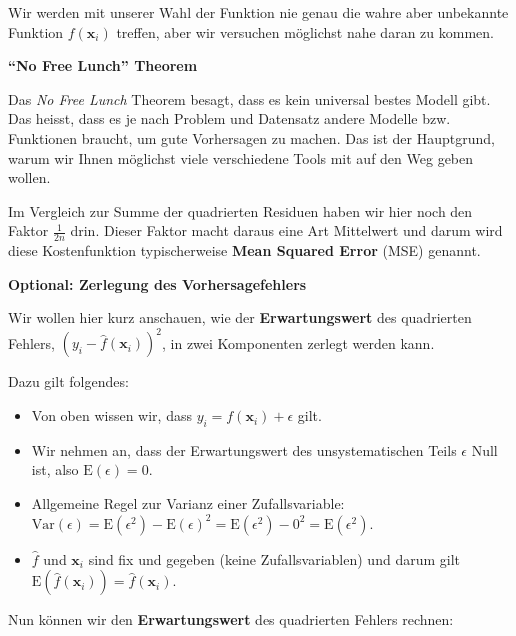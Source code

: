 \documentclass[
]{book}
\providecommand{\tightlist}{%
  \setlength{\itemsep}{0pt}\setlength{\parskip}{0pt}}
\begin{document}
Wir werden mit unserer Wahl der Funktion nie genau die wahre aber unbekannte Funktion \(f(\mathbf{x}_i)\) treffen, aber wir versuchen möglichst nahe daran zu kommen.

\textbf{``No Free Lunch'' Theorem}

Das \emph{No Free Lunch} Theorem besagt, dass es kein universal bestes Modell gibt. Das heisst, dass es je nach Problem und Datensatz andere Modelle bzw. Funktionen braucht, um gute Vorhersagen zu machen. Das ist der Hauptgrund, warum wir Ihnen möglichst viele verschiedene Tools mit auf den Weg geben wollen.

Im Vergleich zur Summe der quadrierten Residuen haben wir hier noch den Faktor \(\frac{1}{2n}\) drin. Dieser Faktor macht daraus eine Art Mittelwert und darum wird diese Kostenfunktion typischerweise \textbf{Mean Squared Error} (MSE) genannt.

\textbf{Optional: Zerlegung des Vorhersagefehlers}

Wir wollen hier kurz anschauen, wie der \textbf{Erwartungswert} des quadrierten Fehlers, \(\left(y_i - \hat{f}(\mathbf{x}_i)\right)^2\), in zwei Komponenten zerlegt werden kann.

Dazu gilt folgendes:

\begin{itemize}
\tightlist
\item
  Von oben wissen wir, dass \(y_i = f(\mathbf{x}_i) + \epsilon\) gilt.
\item
  Wir nehmen an, dass der Erwartungswert des unsystematischen Teils \(\epsilon\) Null ist, also \(\text{E}(\epsilon)=0\).
\item
  Allgemeine Regel zur Varianz einer Zufallsvariable: \(\text{Var}(\epsilon) = \text{E}(\epsilon^2) - \text{E}(\epsilon)^2 = \text{E}(\epsilon^2) - 0^2 = \text{E}(\epsilon^2)\).
\item
  \(\hat{f}\) und \(\mathbf{x}_i\) sind fix und gegeben (keine Zufallsvariablen) und darum gilt \(\text{E}\left(\hat{f}(\mathbf{x}_i)\right)=\hat{f}(\mathbf{x}_i)\).
\end{itemize}

Nun können wir den \textbf{Erwartungswert} des quadrierten Fehlers rechnen:
\end{document}
